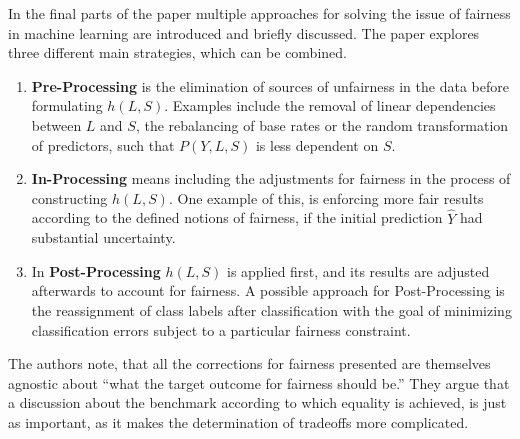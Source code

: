 In the final parts of the paper multiple approaches for solving the issue of fairness in 
machine learning are introduced and briefly discussed. The paper explores three different
main strategies, which can be combined.
\begin{enumerate}
    \item \textbf{Pre-Processing} is the elimination of sources of unfairness in the data before 
    formulating $h(L,S)$. Examples include the removal of linear dependencies between $L$ and
    $S$, the rebalancing of base rates or the random transformation of predictors, such that
    $P(Y,L,S)$ is less dependent on $S$.
    \item \textbf{In-Processing} means including the adjustments for fairness in the process 
    of constructing $h(L,S)$. One example of this, is enforcing more fair results according 
    to the defined notions of fairness, if the initial prediction $\hat{Y}$ had substantial 
    uncertainty.
    \item In \textbf{Post-Processing} $h(L,S)$ is applied first, and its results are adjusted
    afterwards to account for fairness. A possible approach for Post-Processing is the 
    reassignment of class labels after classification with the goal of minimizing 
    classification errors subject to a particular fairness constraint.
\end{enumerate}

The authors note, that all the corrections for fairness presented are themselves agnostic 
about \enquote{what the target outcome for fairness should be.}\cite{Berk.2018} They 
argue that a discussion about the benchmark according to which equality is achieved, is just as
important, as it makes the determination of tradeoffs more complicated.